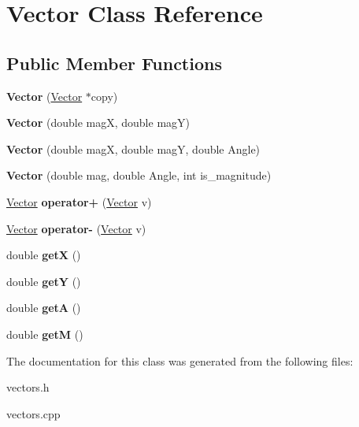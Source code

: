 \hypertarget{classVector}{\section{Vector Class Reference}
\label{classVector}
}
\subsection*{Public Member Functions}
\begin{DoxyCompactItemize}
\item 
\hypertarget{classVector_a07400dfebb57257af19408cf69533e56}{{\bfseries Vector} (\hyperlink{classVector}{Vector} $\ast$copy)}\label{classVector_a07400dfebb57257af19408cf69533e56}

\item 
\hypertarget{classVector_ab628654551031d1493a37ac29243e43e}{{\bfseries Vector} (double mag\-X, double mag\-Y)}\label{classVector_ab628654551031d1493a37ac29243e43e}

\item 
\hypertarget{classVector_a8988df926c0df1793e2c13879c91e130}{{\bfseries Vector} (double mag\-X, double mag\-Y, double Angle)}\label{classVector_a8988df926c0df1793e2c13879c91e130}

\item 
\hypertarget{classVector_abde2117efe024b689a559ebdbdaddb9a}{{\bfseries Vector} (double mag, double Angle, int is\-\_\-magnitude)}\label{classVector_abde2117efe024b689a559ebdbdaddb9a}

\item 
\hypertarget{classVector_abaef65985e13ec3799dfcbdaf273c896}{\hyperlink{classVector}{Vector} {\bfseries operator+} (\hyperlink{classVector}{Vector} v)}\label{classVector_abaef65985e13ec3799dfcbdaf273c896}

\item 
\hypertarget{classVector_a80ed2a39e0e6a5966ad23f339ff1f31a}{\hyperlink{classVector}{Vector} {\bfseries operator-\/} (\hyperlink{classVector}{Vector} v)}\label{classVector_a80ed2a39e0e6a5966ad23f339ff1f31a}

\item 
\hypertarget{classVector_a716d95d7aedf34a3d8ef187d4441e674}{double {\bfseries get\-X} ()}\label{classVector_a716d95d7aedf34a3d8ef187d4441e674}

\item 
\hypertarget{classVector_abd718aec67fd0e9a849e77e1df9f7d73}{double {\bfseries get\-Y} ()}\label{classVector_abd718aec67fd0e9a849e77e1df9f7d73}

\item 
\hypertarget{classVector_ab06b9d3c5bec55284cb901072ee9d56d}{double {\bfseries get\-A} ()}\label{classVector_ab06b9d3c5bec55284cb901072ee9d56d}

\item 
\hypertarget{classVector_a940d8c7e1ff4b230556794a918bdec36}{double {\bfseries get\-M} ()}\label{classVector_a940d8c7e1ff4b230556794a918bdec36}

\end{DoxyCompactItemize}


The documentation for this class was generated from the following files\-:\begin{DoxyCompactItemize}
\item 
vectors.\-h\item 
vectors.\-cpp\end{DoxyCompactItemize}

